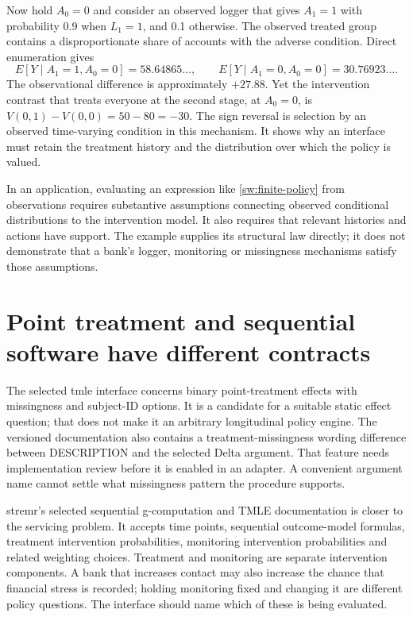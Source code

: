 Now hold \(A_0=0\) and consider an observed logger that gives \(A_1=1\) with
probability 0.9 when \(L_1=1\), and 0.1 otherwise. The observed treated group
contains a disproportionate share of accounts with the adverse condition.
Direct enumeration gives
\[
 E[Y\mid A_1=1,A_0=0]=58.64865\ldots,
 \qquad E[Y\mid A_1=0,A_0=0]=30.76923\ldots.
\]
The observational difference is approximately \(+27.88\). Yet the intervention
contrast that treats everyone at the second stage, at \(A_0=0\), is
\(V(0,1)-V(0,0)=50-80=-30\). The sign reversal is selection by an observed
time-varying condition in this mechanism. It shows why an interface must retain
the treatment history and the distribution over which the policy is valued.

In an application, evaluating an expression like
\eqref{sw:finite-policy} from observations requires substantive assumptions
connecting observed conditional distributions to the intervention model. It
also requires that relevant histories and actions have support. The example
supplies its structural law directly; it does not demonstrate that a bank's
logger, monitoring or missingness mechanisms satisfy those assumptions.

\section{Point treatment and sequential software have different contracts}

The selected tmle interface concerns binary point-treatment effects with
missingness and subject-ID options. It is a candidate for a suitable static
effect question; that does not make it an arbitrary longitudinal policy engine.
The versioned documentation also contains a treatment-missingness wording
difference between DESCRIPTION and the selected Delta argument. That feature
needs implementation review before it is enabled in an adapter. A convenient
argument name cannot settle what missingness pattern the procedure supports.
\cite{tmle}

stremr's selected sequential g-computation and TMLE documentation is closer to
the servicing problem. It accepts time points, sequential outcome-model
formulas, treatment intervention probabilities, monitoring intervention
probabilities and related weighting choices. Treatment and monitoring are
separate intervention components. A bank that increases contact may also
increase the chance that financial stress is recorded; holding monitoring
fixed and changing it are different policy questions. The interface should
name which of these is being evaluated.\cite{stremr}

